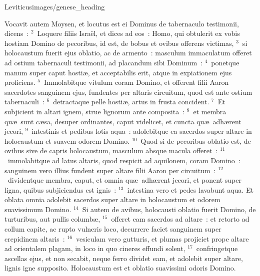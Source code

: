{Leviticus}{images/genese_heading}


\lettrine[lines=6,image=true,loversize=0.05,lraise=-0.03]{V}{}ocavit autem Moysen, et locutus est ei Dominus de tabernaculo testimonii, dicens~:
${}^{2}$~Loquere filiis Isra\"el, et dices ad eos~: Homo, qui obtulerit ex vobis hostiam Domino de pecoribus, id est, de bobus et ovibus offerens victimas,
${}^{3}$~si holocaustum fuerit ejus oblatio, ac de armento~: masculum immaculatum offeret ad ostium tabernaculi testimonii, ad placandum sibi Dominum~:
${}^{4}$~ponetque manum super caput hosti\ae , et acceptabilis erit, atque in expiationem ejus proficiens.
${}^{5}$~Immolabitque vitulum coram Domino, et offerent filii Aaron sacerdotes sanguinem ejus, fundentes per altaris circuitum, quod est ante ostium tabernaculi~:
${}^{6}$~detractaque pelle hosti\ae , artus in frusta concident.
${}^{7}$~Et subjicient in altari ignem, strue lignorum ante composita~:
${}^{8}$~et membra qu\ae\ sunt c\ae sa, desuper ordinantes, caput videlicet, et cuncta qu\ae\ adh\ae rent jecori,
${}^{9}$~intestinis et pedibus lotis aqua~: adolebitque ea sacerdos super altare in holocaustum et suavem odorem Domino.
${}^{10}$~Quod si de pecoribus oblatio est, de ovibus sive de capris holocaustum, masculum absque macula offeret~:
${}^{11}$~immolabitque ad latus altaris, quod respicit ad aquilonem, coram Domino~: sanguinem vero illius fundent super altare filii Aaron per circuitum~:
${}^{12}$~dividentque membra, caput, et omnia qu\ae\ adh\ae rent jecori, et ponent super ligna, quibus subjiciendus est ignis~:
${}^{13}$~intestina vero et pedes lavabunt aqua. Et oblata omnia adolebit sacerdos super altare in holocaustum et odorem suavissimum Domino.
${}^{14}$~Si autem de avibus, holocausti oblatio fuerit Domino, de turturibus, aut pullis columb\ae ,
${}^{15}$~offeret eam sacerdos ad altare~: et retorto ad collum capite, ac rupto vulneris loco, decurrere faciet sanguinem super crepidinem altaris~:
${}^{16}$~vesiculam vero gutturis, et plumas projiciet prope altare ad orientalem plagam, in loco in quo cineres effundi solent,
${}^{17}$~confringetque ascellas ejus, et non secabit, neque ferro dividet eam, et adolebit super altare, lignis igne supposito. Holocaustum est et oblatio suavissimi odoris Domino.

